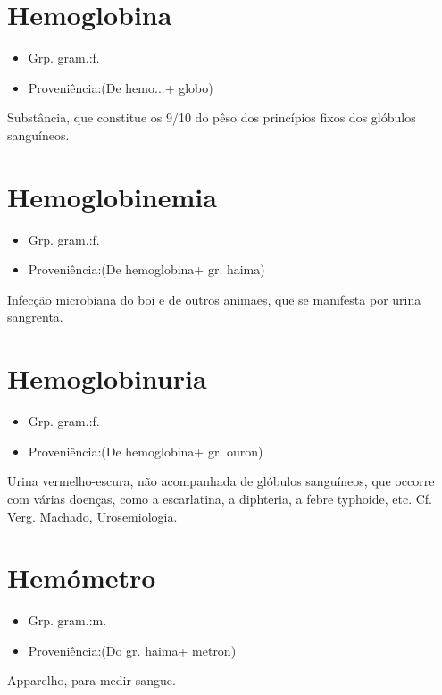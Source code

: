 \documentclass{article}
\begin{document}
\section{Hemoglobina}
\begin{itemize}
\item {Grp. gram.:f.}
\end{itemize}
\begin{itemize}
\item {Proveniência:(De \textunderscore hemo...\textunderscore  + \textunderscore globo\textunderscore )}
\end{itemize}
Substância, que constitue os 9/10 do pêso dos princípios fixos dos glóbulos sanguíneos.
\section{Hemoglobinemia}
\begin{itemize}
\item {Grp. gram.:f.}
\end{itemize}
\begin{itemize}
\item {Proveniência:(De \textunderscore hemoglobina\textunderscore  + gr. \textunderscore haima\textunderscore )}
\end{itemize}
Infecção microbiana do boi e de outros animaes, que se manifesta por urina sangrenta.
\section{Hemoglobinuria}
\begin{itemize}
\item {Grp. gram.:f.}
\end{itemize}
\begin{itemize}
\item {Proveniência:(De \textunderscore hemoglobina\textunderscore  + gr. \textunderscore ouron\textunderscore )}
\end{itemize}
Urina vermelho-escura, não acompanhada de glóbulos sanguíneos, que occorre com várias doenças, como a escarlatina, a diphteria, a febre typhoide, etc. Cf. Verg. Machado, \textunderscore Urosemiologia\textunderscore .
\section{Hemómetro}
\begin{itemize}
\item {Grp. gram.:m.}
\end{itemize}
\begin{itemize}
\item {Proveniência:(Do gr. \textunderscore haima\textunderscore  + \textunderscore metron\textunderscore )}
\end{itemize}
Apparelho, para medir sangue.
\end{document}
